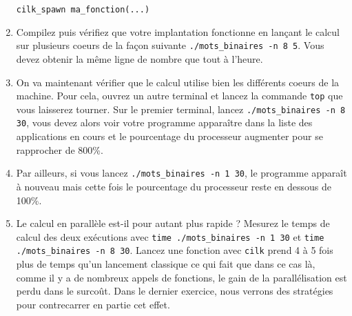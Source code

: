 \documentclass{cours}
\newcommand{\lsti}[1]{\lstinline{#1}{}}
\begin{document}
\begin{exercice}
\begin{enumerate}
\begin{lstlisting}
cilk_spawn ma_fonction(...)
\end{lstlisting}

\item Compilez puis vérifiez que votre implantation fonctionne en lançant le calcul sur plusieurs coeurs de la façon suivante \lsti{./mots_binaires -n 8 5}. Vous devez obtenir la même ligne de nombre que tout à l'heure.

\item On va maintenant vérifier que le calcul utilise bien les différents coeurs de la machine. Pour cela, ouvrez un autre terminal et lancez la commande \lsti{top} que vous laisserez tourner. Sur le premier terminal, lancez \lsti{./mots_binaires -n 8 30}, vous devez alors voir votre programme apparaître dans la liste des applications en cours et le pourcentage du processeur augmenter pour se rapprocher de 800\%.

\item Par ailleurs, si vous lancez \lsti{./mots_binaires -n 1 30}, le programme apparaît à nouveau mais cette fois le pourcentage du processeur reste en dessous de 100\%.

\item Le calcul en parallèle est-il pour autant plus rapide ? Mesurez le temps de calcul des deux exécutions avec \lsti{time ./mots_binaires -n 1 30} et \lsti{time ./mots_binaires -n 8 30}. Lancez une fonction avec \lsti{cilk} prend 4 à 5 fois plus de temps qu'un lancement classique ce qui fait que dans ce cas là, comme il y a de nombreux appels de fonctions, le gain de la parallélisation est perdu dans le surcoût. Dans le dernier exercice, nous verrons des stratégies pour contrecarrer en partie cet effet. 

\end{enumerate}

\end{exercice}
\end{document}
